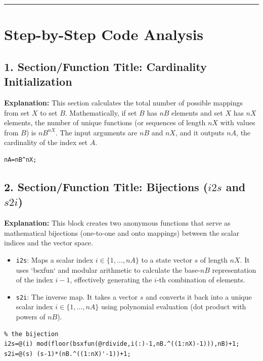 \vspace{0.5cm}
\hrule
\vspace{0.5cm}

\section{Step-by-Step Code Analysis}

\subsection{1. Section/Function Title: Cardinality Initialization}
\textbf{Explanation:} This section calculates the total number of possible mappings from set $X$ to set $B$. Mathematically, if set $B$ has $nB$ elements and set $X$ has $nX$ elements, the number of unique functions (or sequences of length $nX$ with values from $B$) is $nB^{nX}$. The input arguments are $nB$ and $nX$, and it outputs $nA$, the cardinality of the index set $A$.
\begin{lstlisting}
nA=nB^nX;
\end{lstlisting}


\subsection{2. Section/Function Title: Bijections ($i2s$ and $s2i$)}
\textbf{Explanation:} This block creates two anonymous functions that serve as mathematical bijections (one-to-one and onto mappings) between the scalar indices and the vector space. 
\begin{itemize}
    \item \texttt{i2s}: Maps a scalar index $i \in \{1, \dots, nA\}$ to a state vector $s$ of length $nX$. It uses `bsxfun` and modular arithmetic to calculate the base-$nB$ representation of the index $i-1$, effectively generating the $i$-th combination of elements.
    \item \texttt{s2i}: The inverse map. It takes a vector $s$ and converts it back into a unique scalar index $i \in \{1, \dots, nA\}$ using polynomial evaluation (dot product with powers of $nB$).
\end{itemize}
\begin{lstlisting}
% the bijection
i2s=@(i) mod(floor(bsxfun(@rdivide,i(:)-1,nB.^((1:nX)-1))),nB)+1;
s2i=@(s) (s-1)*(nB.^((1:nX)'-1))+1;
\end{lstlisting}


